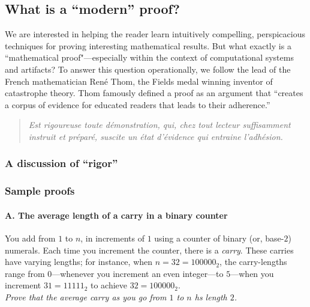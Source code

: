 \subsection{What is a ``modern'' proof?}

We are interested in helping the reader learn intuitively compelling,
perspicacious techniques for proving interesting mathematical results.
But what exactly is a ``mathematical proof"---especially within the
context of computational systems and artifacts?  To answer this
question operationally, we follow the lead of the French mathematician
Ren\'e Thom,  the Fields medal winning inventor
of catastrophe theory.  Thom famously defined a proof as an argument
that ``creates a corpus of evidence for educated readers that leads
to their adherence.''
\begin{quote}
{\em Est rigoureuse toute d\'{e}monstration, qui, chez tout lecteur
  suffisamment instruit et pr\'{e}par\'{e}, suscite un \'{e}tat
  d'\'{e}vidence qui entraine l'adh\'{e}sion.}
\end{quote}



\subsubsection{A discussion of ``rigor''}

\subsubsection{Sample proofs}

\paragraph{\small\sf A. The average length of a carry in a binary counter}

%
You add from $1$ to $n$, in increments of $1$ using a counter of
binary (or, base-$2$) numerals.  Each time you increment the counter,
there is a {\it carry}.  These carries have varying lengths; for
instance, when $n = 32 = 100000_2$, the carry-lengths range
from $0$---whenever you increment an even integer---to $5$---when you
increment $31 = 11111_2$ to achieve $32 = 100000_2$. \\
{\em Prove that the average carry as you go from $1$ to $n$ hs length $2$.}

